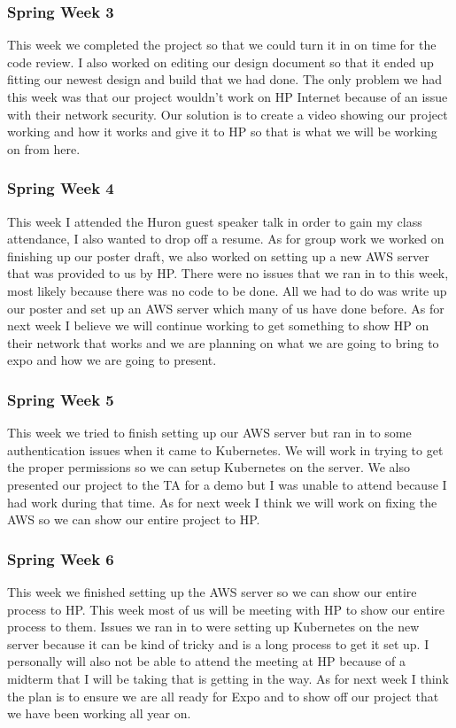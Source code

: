\documentclass[onecolumn, draftclsnofoot,10pt, compsoc]{IEEEtran}
\begin{document}
\subsubsection*{Spring Week 3}
This week we completed the project so that we could turn it in on time for the code review. I also worked on editing our design document so that it ended up fitting our newest design and build that we had done. The only problem we had this week was that our project wouldn’t work on HP Internet because of an issue with their network security. Our solution is to create a video showing our project working and how it works and give it to HP so that is what we will be working on from here.
\subsubsection*{Spring Week 4}
This week I attended the Huron guest speaker talk in order to gain my class attendance, I also wanted to drop off a resume. As for group work we worked on finishing up our poster draft, we also worked on setting up a new AWS server that was provided to us by HP. There were no issues that we ran in to this week, most likely because there was no code to be done. All we had to do was write up our poster and set up an AWS server which many of us have done before. As for next week I believe we will continue working to get something to show HP on their network that works and we are planning on what we are going to bring to expo and how we are going to present.
\subsubsection*{Spring Week 5}
This week we tried to finish setting up our AWS server but ran in to some authentication issues when it came to Kubernetes. We will work in trying to get the proper permissions so we can setup Kubernetes on the server. We also presented our project to the TA for a demo but I was unable to attend because I had work during that time. As for next week I think we will work on fixing the AWS so we can show our entire project to HP.
\subsubsection*{Spring Week 6}
This week we finished setting up the AWS server so we can show our entire process to HP. This week most of us will be meeting with HP to show our entire process to them. Issues we ran in to were setting up Kubernetes on the new server because it can be kind of tricky and is a long process to get it set up. I personally will also not be able to attend the meeting at HP because of a midterm that I will be taking that is getting in the way. As for next week I think the plan is to ensure we are all ready for Expo and to show off our project that we have been working all year on.
\end{document}

